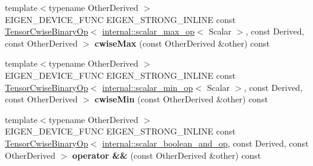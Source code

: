 \begin{DoxyCompactItemize}
\item 
\mbox{\label{class_eigen_1_1_tensor_base_3_01_derived_00_01_read_only_accessors_01_4_a0cb745c95f23e51e08de1730f7263b55}} 
{\footnotesize template$<$typename Other\+Derived $>$ }\\E\+I\+G\+E\+N\+\_\+\+D\+E\+V\+I\+C\+E\+\_\+\+F\+U\+NC E\+I\+G\+E\+N\+\_\+\+S\+T\+R\+O\+N\+G\+\_\+\+I\+N\+L\+I\+NE const \hyperlink{class_eigen_1_1_tensor_cwise_binary_op}{Tensor\+Cwise\+Binary\+Op}$<$ \hyperlink{struct_eigen_1_1internal_1_1scalar__max__op}{internal\+::scalar\+\_\+max\+\_\+op}$<$ Scalar $>$, const Derived, const Other\+Derived $>$ {\bfseries cwise\+Max} (const Other\+Derived \&other) const
\item 
\mbox{\label{class_eigen_1_1_tensor_base_3_01_derived_00_01_read_only_accessors_01_4_ad67d527186b73b3568bde7cfa602b590}} 
{\footnotesize template$<$typename Other\+Derived $>$ }\\E\+I\+G\+E\+N\+\_\+\+D\+E\+V\+I\+C\+E\+\_\+\+F\+U\+NC E\+I\+G\+E\+N\+\_\+\+S\+T\+R\+O\+N\+G\+\_\+\+I\+N\+L\+I\+NE const \hyperlink{class_eigen_1_1_tensor_cwise_binary_op}{Tensor\+Cwise\+Binary\+Op}$<$ \hyperlink{struct_eigen_1_1internal_1_1scalar__min__op}{internal\+::scalar\+\_\+min\+\_\+op}$<$ Scalar $>$, const Derived, const Other\+Derived $>$ {\bfseries cwise\+Min} (const Other\+Derived \&other) const
\item 
\mbox{\label{class_eigen_1_1_tensor_base_3_01_derived_00_01_read_only_accessors_01_4_a954d52ec1daa0a2d2086867461d51335}} 
{\footnotesize template$<$typename Other\+Derived $>$ }\\E\+I\+G\+E\+N\+\_\+\+D\+E\+V\+I\+C\+E\+\_\+\+F\+U\+NC E\+I\+G\+E\+N\+\_\+\+S\+T\+R\+O\+N\+G\+\_\+\+I\+N\+L\+I\+NE const \hyperlink{class_eigen_1_1_tensor_cwise_binary_op}{Tensor\+Cwise\+Binary\+Op}$<$ \hyperlink{struct_eigen_1_1internal_1_1scalar__boolean__and__op}{internal\+::scalar\+\_\+boolean\+\_\+and\+\_\+op}, const Derived, const Other\+Derived $>$ {\bfseries operator \&\&} (const Other\+Derived \&other) const
\item 
\mbox{\label{class_eigen_1_1_tensor_base_3_01_derived_00_01_read_only_accessors_01_4_a65692aa17f6f9a9617d833153c736935}} 

\end{DoxyCompactItemize}
